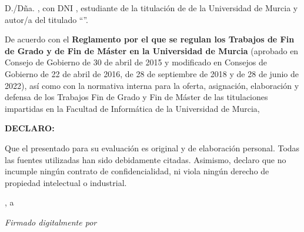 

D./Dña. \textbf{\miNombre}, con DNI \textbf{\miDNI}, estudiante de la
titulación de \textbf{\miGrado} de la Universidad de Murcia y autor/a del
\tipotrabajo{} titulado \enquote{\textbf{\titulo}}.

\vspace{1cm}

De acuerdo con el \textbf{Reglamento por el que se regulan los Trabajos de Fin de Grado y de Fin de Máster en la Universidad de Murcia} (aprobado en Consejo de Gobierno de 30 de abril de 2015 y modificado en Consejos de Gobierno de 22 de abril de 2016, de 28 de septiembre de 2018 y de 28 de junio de 2022), así como con la normativa interna para la oferta, asignación, elaboración y defensa de los Trabajos Fin de Grado y Fin de Máster de las titulaciones impartidas en la Facultad de Informática de la Universidad de Murcia,

\vspace{1cm}

\textbf{DECLARO:}

\vspace{0.5cm}

Que el \tipotrabajo{} presentado para su evaluación es original y
de elaboración personal. Todas las fuentes utilizadas han sido
debidamente citadas. Asimismo, declaro que no incumple ningún contrato
de confidencialidad, ni viola ningún derecho de propiedad intelectual o
industrial.

\vspace{1cm}

\begin{center}
\miUbicacion, a \miFecha

\vspace{0.5cm}

\textit{Firmado digitalmente por \miNombre}
\end{center}
